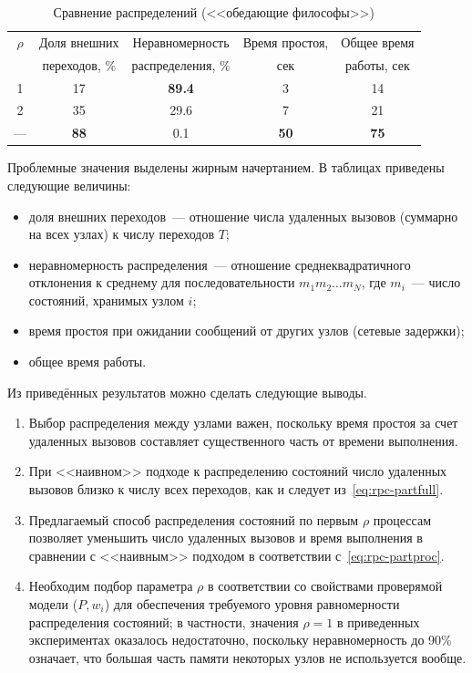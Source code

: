 \documentclass[12pt,a4paper,fleqn]{article}
\begin{document}
\begin{table}[htb]
  \centering
  \begin{tabular}{|c|c|c|c|c|}
    \hline
    $\rho$ & Доля внешних        & Неравномерность   & Время простоя, & Общее время \\
           & переходов, \%       & распределения, \% & сек            & работы, сек         \\ \hline
    1      & 17                  & \textbf{89.4}     & 3              & 14                  \\ \hline
    2      & 35                  & 29.6              & 7              & 21                  \\ \hline
    ---    & \textbf{88}         & 0.1               & \textbf{50}    & \textbf{75}         \\ \hline
  \end{tabular}
  \caption{Сравнение распределений (<<обедающие философы>>)}
  \label{tab:philo-results}
\end{table}


Проблемные значения выделены жирным начертанием. В таблицах приведены следующие величины:

\begin{itemize}
\item доля внешних переходов~--- отношение числа удаленных вызовов (суммарно на всех узлах) к числу переходов $T$;
\item неравномерность распределения~--- отношение среднеквадратичного отклонения к среднему для последовательности $m_1
  m_2 \ldots m_N$, где $m_i$~--- число состояний, хранимых узлом $i$;
\item время простоя при ожидании сообщений от других узлов (сетевые задержки);
\item общее время работы.
\end{itemize}

Из приведённых результатов можно сделать следующие выводы.

\begin{enumerate}
\item Выбор распределения между узлами важен, поскольку время простоя за счет удаленных вызовов составляет существенного
  часть от времени выполнения.

\item При <<наивном>> подходе к распределению состояний число удаленных вызовов близко к числу всех переходов, как и следует из~\eqref{eq:rpc-partfull}.

\item Предлагаемый способ распределения состояний по первым $\rho$ процессам позволяет уменьшить число удаленных вызовов
  и время выполнения в сравнении с <<наивным>> подходом в соответствии с~\eqref{eq:rpc-partproc}.

\item Необходим подбор параметра $\rho$ в соответствии со свойствами проверямой модели ($P, w_i$) для обеспечения
  требуемого уровня равномерности распределения состояний; в частности, значения $\rho = 1$ в приведенных экспериментах
  оказалось недостаточно, поскольку неравномерность до 90\% означает, что большая часть памяти некоторых узлов не
  используется вообще.
\end{enumerate}
\end{document}
